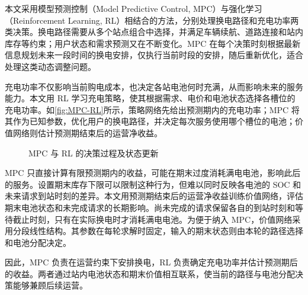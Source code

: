 \documentclass[12pt,a4paper,UTF8]{ctexart}
\begin{document}
本文采用模型预测控制（Model Predictive Control, MPC）与强化学习（Reinforcement Learning, RL）相结合的方法，分别处理换电路径和充电功率两类决策。换电路径需要从多个站点组合中选择，并满足车辆续航、道路连接和站内库存等约束；用户状态和需求预测又在不断变化。MPC 在每个决策时刻根据最新信息规划未来一段时间的换电安排，仅执行当前时段的安排，随后重新优化，适合处理这类动态调整问题。

充电功率不仅影响当前购电成本，也决定各站电池何时充满，从而影响未来的服务能力。本文用 RL 学习充电策略，使其根据需求、电价和电池状态选择各槽位的充电功率。如\autoref{fig:MPC-RL}所示，策略网络先给出预测期内的充电功率；MPC 将其作为已知参数，优化用户的换电路径，并决定每次服务使用哪个槽位的电池；价值网络则估计预测期结束后的运营净收益。

\begin{figure}[!htbp]
  \centering
  \caption{MPC 与 RL 的决策过程及状态更新}
  \label{fig:MPC-RL}
\end{figure}

MPC 只直接计算有限预测期内的收益，可能在期末过度消耗满电电池，影响此后的服务。设置期末库存下限可以限制这种行为，但难以同时反映各电池的 SOC 和未来请求到站时刻的差异。本文用预测期结束后的运营净收益训练价值网络，评估期末电池状态和未完成请求的长期影响。尚未完成的请求保留各自的到站时刻和等待截止时刻，只有在实际换电时才消耗满电电池。为便于纳入 MPC，价值网络采用分段线性结构。其参数在每轮求解时固定，输入的期末状态则由本轮的路径选择和电池分配决定。

因此，MPC 负责在运营约束下安排换电，RL 负责确定充电功率并估计预测期后的收益。两者通过站内电池状态和期末价值相互联系，使当前的路径与电池分配决策能够兼顾后续运营。
\end{document}
